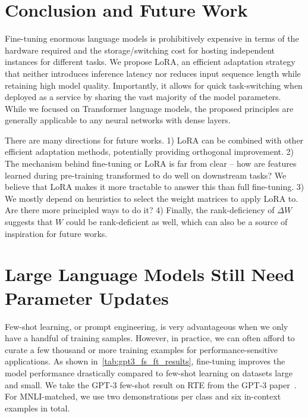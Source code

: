 \documentclass{article} %
\begin{document}
\section{Conclusion and Future Work}

Fine-tuning enormous language models is prohibitively expensive in terms of the hardware required and the storage/switching cost for hosting independent instances for different tasks.
We propose LoRA, an efficient adaptation strategy that neither introduces inference latency nor reduces input sequence length while retaining high model quality.
Importantly, it allows for quick task-switching when deployed as a service by sharing the vast majority of the model parameters.
While we focused on Transformer language models, the proposed principles are generally applicable to any neural networks with dense layers.

There are many directions for future works.
1) LoRA can be combined with other efficient adaptation methods, potentially providing orthogonal improvement.
2) The mechanism behind fine-tuning or LoRA is far from clear -- how are features learned during pre-training transformed to do well on downstream tasks?
We believe that LoRA makes it more tractable to answer this than full fine-tuning.
3) We mostly depend on heuristics to select the weight matrices to apply LoRA to.
Are there more principled ways to do it?
4) Finally, the rank-deficiency of $\Delta W$ suggests that $W$ could be rank-deficient as well, which can also be a source of inspiration for future works.






\appendix

\section{Large Language Models Still Need Parameter Updates}
\label{app:fewshot_vs_finetune}

Few-shot learning, or prompt engineering, is very advantageous when we only have a handful of training samples.
However, in practice, we can often afford to curate a few thousand or more training examples for performance-sensitive applications.
As shown in~\autoref{tab:gpt3_fs_ft_results}, fine-tuning improves the model performance drastically compared to few-shot learning on datasets large and small.
We take the GPT-3 few-shot result on RTE from the GPT-3 paper~\citep{brown_language_2020}.
For MNLI-matched, we use two demonstrations per class and six in-context examples in total.
\end{document}
